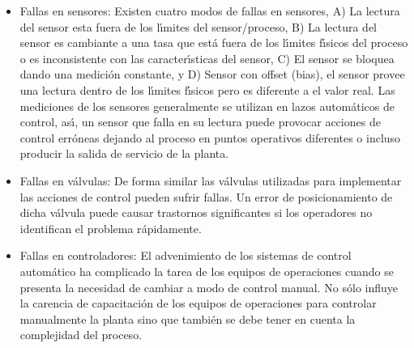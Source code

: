 \begin{itemize}
    \item Fallas en sensores: Existen cuatro modos de fallas en sensores, A) La lectura del sensor esta
    fuera de los l{\'\i}mites del sensor/proceso, B) La lectura del sensor es cambiante a una tasa que est{\'a} fuera
    de los l{\'\i}mites f{\'\i}sicos del proceso o es inconsistente con las caracter{\'\i}sticas del sensor, C) El sensor
    se bloquea dando una medici{\'o}n constante, y D) Sensor con offset (bias), el sensor provee una lectura
    dentro de los l{\'\i}mites f{\'\i}sicos pero es diferente a el valor real. Las mediciones de los sensores
    generalmente se utilizan en lazos autom{\'a}ticos de control, as{\'\i}, un sensor que falla en su lectura puede
    provocar acciones de control err{\'o}neas dejando al proceso en puntos operativos diferentes o incluso
    producir la salida de servicio de la planta.
    \item Fallas en v{\'a}lvulas: De forma similar las v{\'a}lvulas utilizadas para implementar las acciones de
    control pueden sufrir fallas. Un error de posicionamiento de dicha v{\'a}lvula puede causar trastornos
    significantes si los operadores no identifican el problema r{\'a}pidamente.
    \item Fallas en controladores: El advenimiento de los sistemas de control autom{\'a}tico ha complicado la
    tarea de los equipos de operaciones cuando se presenta la necesidad de cambiar a modo de control manual.
    No s{\'o}lo influye la carencia de capacitaci{\'o}n de los equipos de operaciones para controlar manualmente la
    planta sino que tambi{\'e}n se debe tener en cuenta la complejidad del proceso.
\end{itemize}

